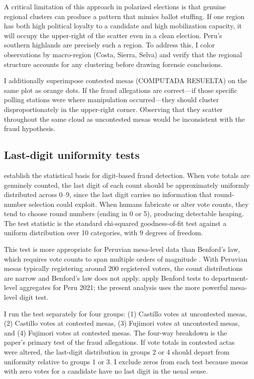 \documentclass[12pt]{article}
\begin{document}
A critical limitation of this approach in polarized elections is that genuine
regional clusters can produce a pattern that mimics ballot stuffing. If one
region has both high political loyalty to a candidate and high mobilization
capacity, it will occupy the upper-right of the scatter even in a clean
election. Peru's southern highlands are precisely such a region. To address
this, I color observations by macro-region (Costa, Sierra, Selva) and verify
that the regional structure accounts for any clustering before drawing
forensic conclusions.

I additionally superimpose contested mesas (COMPUTADA RESUELTA) on the same
plot as orange dots. If the fraud allegations are correct---if those specific
polling stations were where manipulation occurred---they should cluster
disproportionately in the upper-right corner. Observing that they scatter
throughout the same cloud as uncontested mesas would be inconsistent with
the fraud hypothesis.

\subsection{Last-digit uniformity tests}

\citet{beber2012} establish the statistical basis for digit-based fraud
detection. When vote totals are genuinely counted, the last digit of each
count should be approximately uniformly distributed across 0--9, since the
last digit carries no information that round-number selection could exploit.
When humans fabricate or alter vote counts, they tend to choose round numbers
(ending in 0 or 5), producing detectable heaping. The test statistic is the
standard chi-squared goodness-of-fit test against a uniform distribution over
10 categories, with $9$ degrees of freedom.

This test is more appropriate for Peruvian mesa-level data than Benford's
law, which requires vote counts to span multiple orders of magnitude
\citep{deckert2011}. With Peruvian mesas typically registering around 200
registered voters, the count distributions are narrow and Benford's law does
not apply. \citet{isea2021} apply Benford tests to department-level
aggregates for Peru 2021; the present analysis uses the more
powerful mesa-level digit test.

I run the test separately for four groups: (1) Castillo votes at uncontested
mesas, (2) Castillo votes at contested mesas, (3) Fujimori votes at
uncontested mesas, and (4) Fujimori votes at contested mesas. The four-way
breakdown is the paper's primary test of the fraud allegations. If vote totals
in contested actas were altered, the last-digit distribution in groups 2 or 4
should depart from uniformity relative to groups 1 or 3. I exclude zeros
from each test because mesas with zero votes for a candidate have no last
digit in the usual sense.
\end{document}
